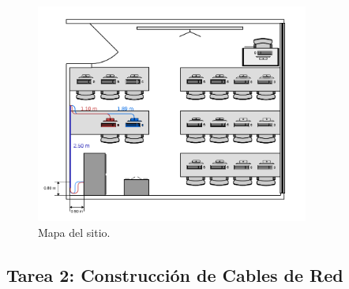         \begin{figure}[H]
            \centering
            \includegraphics[width=0.8\textwidth]{img/planos.png}
            \caption{Mapa del sitio.}
            \label{fig:mapa_sitio}
        \end{figure}

    \subsection{Tarea 2: Construcción de Cables de Red}
